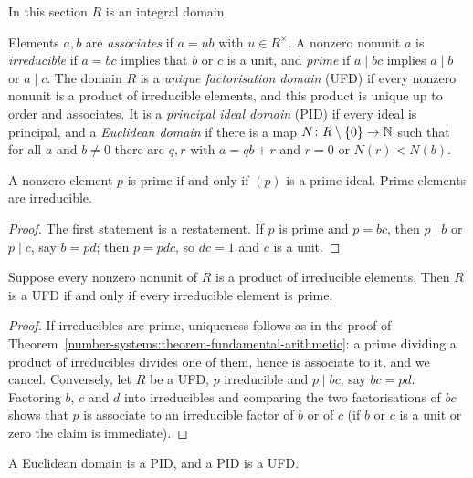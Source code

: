 In this section $R$ is an integral domain.

\begin{definition}\label{rings:definition-irreducible}
Elements $a, b$ are \emph{associates} if $a = ub$ with $u \in R^\times$. A nonzero
nonunit $a$ is \emph{irreducible} if $a = bc$ implies that $b$ or $c$ is a unit, and
\emph{prime} if $a \mid bc$ implies $a \mid b$ or $a \mid c$. The domain $R$ is a
\emph{unique factorisation domain} (UFD) if every nonzero nonunit is a product of
irreducible elements, and this product is unique up to order and associates. It is
a \emph{principal ideal domain} (PID) if every ideal is principal, and a
\emph{Euclidean domain} if there is a map $N \colon R \setminus \{0\} \to \mathbb{N}$ such that
for all $a$ and $b \neq 0$ there are $q, r$ with $a = qb + r$ and $r = 0$ or $N(r) < N(b)$.
\end{definition}

\begin{lemma}\label{rings:lemma-prime-irreducible}
A nonzero element $p$ is prime if and only if $(p)$ is a prime ideal. Prime elements
are irreducible.
\end{lemma}

\begin{proof}
The first statement is a restatement. If $p$ is prime and $p = bc$, then $p \mid b$ or
$p \mid c$, say $b = pd$; then $p = pdc$, so $dc = 1$ and $c$ is a unit.
\end{proof}

\begin{lemma}\label{rings:lemma-ufd-criterion}
Suppose every nonzero nonunit of $R$ is a product of irreducible elements. Then $R$
is a UFD if and only if every irreducible element is prime.
\end{lemma}

\begin{proof}
If irreducibles are prime, uniqueness follows as in the proof of
Theorem~\ref{number-systems:theorem-fundamental-arithmetic}: a prime dividing a product
of irreducibles divides one of them, hence is associate to it, and we cancel.
Conversely, let $R$ be a UFD, $p$ irreducible and $p \mid bc$, say $bc = pd$. Factoring
$b$, $c$ and $d$ into irreducibles and comparing the two factorisations of $bc$ shows
that $p$ is associate to an irreducible factor of $b$ or of $c$ (if $b$ or $c$ is a unit
or zero the claim is immediate).
\end{proof}

\begin{theorem}\label{rings:theorem-euclidean-pid-ufd}
A Euclidean domain is a PID, and a PID is a UFD.
\end{theorem}

